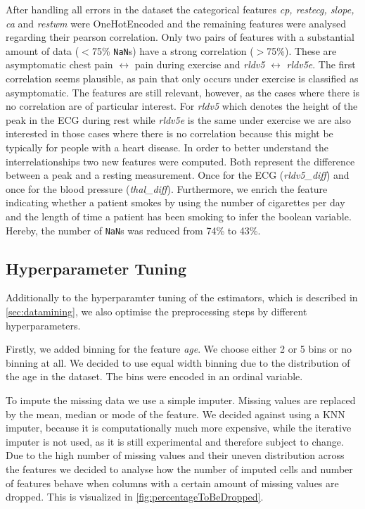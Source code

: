 After handling all errors in the dataset the categorical features \textit{cp, restecg, slope, ca} and \textit{restwm} were OneHotEncoded and the remaining features were analysed regarding their pearson correlation. Only two pairs of features with a substantial amount of data ($<$75\% \texttt{NaN}s) have a strong correlation ($>$75\%).  
These are asymptomatic chest pain $\leftrightarrow$ pain during exercise and \textit{rldv5} $\leftrightarrow$ \textit{rldv5e}. The first correlation seems plausible, as pain that only occurs under exercise is classified as asymptomatic. The features are still relevant, however, as the cases where there is no correlation are of particular interest. For \textit{rldv5} which denotes the height of the peak in the ECG during rest while \textit{rldv5e} is the same under exercise we are also interested in those cases where there is no correlation because this might be typically for people with a heart disease. In order to better understand the interrelationships two new features were computed. Both represent the difference between a peak and a resting measurement. Once for the ECG (\textit{rldv5\_diff}) and once for the blood pressure (\textit{thal\_diff}). 
Furthermore, we enrich the feature indicating whether a patient smokes by using the number of cigarettes per day and the length of time a patient has been smoking to infer the boolean variable. Hereby, the number of \texttt{NaN}s was reduced from 74\% to 43\%. 

\subsection{Hyperparameter Tuning} \label{subsec:hyperparametertuning}
Additionally to the hyperparamter tuning of the estimators, which is described in \cref{sec:datamining}, we also optimise the preprocessing steps by different hyperparameters.

Firstly, we added binning for the feature \textit{age}. We choose either 2 or 5 bins or no binning at all. We decided to use equal width binning due to the distribution of the age in the dataset.  The bins were encoded in an ordinal variable.

To impute the missing data we use a simple imputer. Missing values are replaced by the mean, median or mode of the feature. We decided against using a KNN imputer, because it is computationally much more expensive, while the iterative imputer is not used, as it is still experimental and therefore subject to change. Due to the high number of missing values and their uneven distribution across the features we decided to analyse how the number of imputed cells and number of features behave when columns with a certain amount of missing values are dropped. This is visualized in \cref{fig:percentageToBeDropped}.

